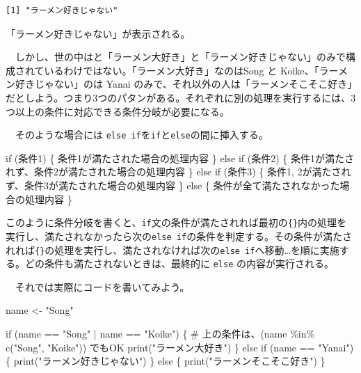 \documentclass[
  a4paper,
  pandoc,
  ja=standard,
  jafont=haranoaji]{bxjsbook}
\newenvironment{Shaded}{\begin{snugshade}}{\end{snugshade}}
\newcommand{\CommentTok}[1]{\textcolor[rgb]{0.37,0.37,0.37}{#1}}
\newcommand{\ControlFlowTok}[1]{\textcolor[rgb]{0.00,0.48,0.65}{#1}}
\newcommand{\FunctionTok}[1]{\textcolor[rgb]{0.28,0.35,0.67}{#1}}
\newcommand{\NormalTok}[1]{\textcolor[rgb]{0.00,0.48,0.65}{#1}}
\newcommand{\OtherTok}[1]{\textcolor[rgb]{0.00,0.48,0.65}{#1}}
\newcommand{\SpecialCharTok}[1]{\textcolor[rgb]{0.37,0.37,0.37}{#1}}
\newcommand{\StringTok}[1]{\textcolor[rgb]{0.13,0.47,0.30}{#1}}
\begin{document}
\begin{verbatim}
[1] "ラーメン好きじゃない"
\end{verbatim}

「ラーメン好きじゃない」が表示される。

　しかし、世の中はと「ラーメン大好き」と「ラーメン好きじゃない」のみで構成されているわけではない。「ラーメン大好き」なのはSong
と Koike、「ラーメン好きじゃない」のは Yanai
のみで、それ以外の人は「ラーメンそこそこ好き」だとしよう。つまり3つのパタンがある。それぞれに別の処理を実行するには、3つ以上の条件に対応できる条件分岐が必要になる。

　そのような場合には
\texttt{else\ if}を\texttt{if}と\texttt{else}の間に挿入する。

\begin{Shaded}
\begin{Highlighting}[]
\ControlFlowTok{if}\NormalTok{ (条件1) \{}
\NormalTok{  条件1が満たされた場合の処理内容}
\NormalTok{\} }\ControlFlowTok{else} \ControlFlowTok{if}\NormalTok{ (条件2) \{}
\NormalTok{  条件1が満たされず、条件2が満たされた場合の処理内容}
\NormalTok{\} }\ControlFlowTok{else} \ControlFlowTok{if}\NormalTok{ (条件3) \{}
\NormalTok{  条件1, 2が満たされず、条件3が満たされた場合の処理内容}
\NormalTok{\} }\ControlFlowTok{else}\NormalTok{ \{}
\NormalTok{  条件が全て満たされなかった場合の処理内容}
\NormalTok{\}}
\end{Highlighting}
\end{Shaded}

このように条件分岐を書くと、\texttt{if}文の条件が満たされれば最初の\texttt{\{\}}内の処理を実行し、満たされなかったら次の\texttt{else\ if}の条件を判定する。その条件が満たされれば\texttt{\{\}}の処理を実行し、満たされなければ次の\texttt{else\ if}へ移動\ldots を順に実施する。どの条件も満たされないときは、最終的に
\texttt{else} の内容が実行される。

　それでは実際にコードを書いてみよう。

\begin{Shaded}
\begin{Highlighting}[numbers=left,,]
\NormalTok{name }\OtherTok{\textless{}{-}} \StringTok{"Song"}

\ControlFlowTok{if}\NormalTok{ (name }\SpecialCharTok{==} \StringTok{"Song"} \SpecialCharTok{|}\NormalTok{ name }\SpecialCharTok{==} \StringTok{"Koike"}\NormalTok{) \{}
  \CommentTok{\# 上の条件は、(name \%in\% c("Song", "Koike"))  でもOK}
  \FunctionTok{print}\NormalTok{(}\StringTok{"ラーメン大好き"}\NormalTok{)}
\NormalTok{\} }\ControlFlowTok{else} \ControlFlowTok{if}\NormalTok{ (name }\SpecialCharTok{==} \StringTok{"Yanai"}\NormalTok{) \{}
  \FunctionTok{print}\NormalTok{(}\StringTok{"ラーメン好きじゃない"}\NormalTok{)}
\NormalTok{\} }\ControlFlowTok{else}\NormalTok{ \{}
  \FunctionTok{print}\NormalTok{(}\StringTok{"ラーメンそこそこ好き"}\NormalTok{)}
\NormalTok{\}}
\end{Highlighting}
\end{Shaded}
\end{document}
